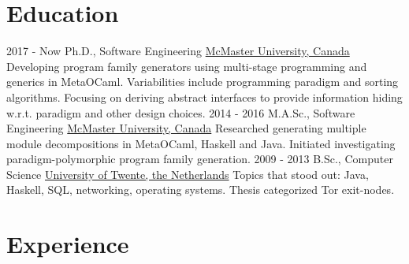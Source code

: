 \documentclass[letterpaper]{twentysecondcv} %
\begin{document}
\makeprofile %



\section{Education}

\begin{twenty} %
  \twentyitem
    {2017 - Now}
    {}
    {Ph.D., Software Engineering}
    {\href{https://www.mcmaster.ca/}{McMaster University, Canada}}
    {
      Developing program family generators using multi-stage programming and generics in MetaOCaml.
      Variabilities include programming paradigm and sorting algorithms. Focusing on deriving abstract interfaces to provide information hiding w.r.t. paradigm and other design choices.
    }
    {}
  \twentyitem
    {2014 - 2016}
    {}
    {M.A.Sc., Software Engineering}
    {\href{https://www.mcmaster.ca/}{McMaster University, Canada}}
    {
      Researched generating multiple module decompositions in MetaOCaml, Haskell and Java.
      Initiated investigating paradigm-polymorphic program family generation.
    }
    {}
  \twentyitem
    {2009 - 2013}
    {}
    {B.Sc., Computer Science}%
    {\href{https://www.utwente.nl/}{University of Twente, the Netherlands}}
    {Topics that stood out: Java, Haskell, SQL, networking, operating systems. Thesis categorized Tor exit-nodes.}
    {}
\end{twenty}
\vspace{-.5em}


\section{Experience}
\end{document}
